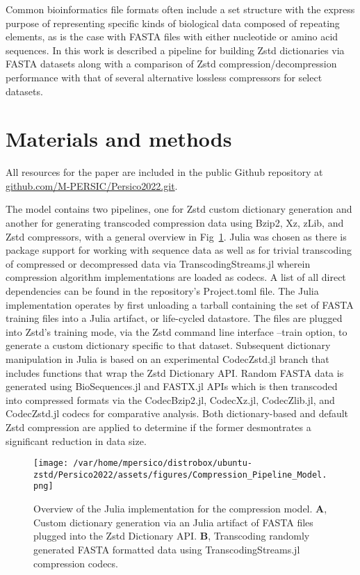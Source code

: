 \documentclass[
  10pt,
  letterpaper,
]{article}
\begin{document}
Common bioinformatics file formats often include a set structure with
the express purpose of representing specific kinds of biological data
composed of repeating elements, as is the case with FASTA files with
either nucleotide or amino acid sequences. In this work is described a
pipeline for building Zstd dictionaries via FASTA datasets along with a
comparison of Zstd compression/decompression performance with that of
several alternative lossless compressors for select datasets.

\hypertarget{materials-and-methods}{%
\section{Materials and methods}\label{materials-and-methods}}

All resources for the paper are included in the public Github repository
at
\href{https://www.github.com/M-PERSIC/Persico2022.git}{github.com/M-PERSIC/Persico2022.git}.

The model contains two pipelines, one for Zstd custom dictionary
generation and another for generating transcoded compression data using
Bzip2, Xz, zLib, and Zstd compressors, with a general overview in
Fig~\ref{fig-model}. Julia was chosen as there is package support for
working with sequence data as well as for trivial transcoding of
compressed or decompressed data via TranscodingStreams.jl wherein
compression algorithm implementations are loaded as codecs\citep{sato}.
A list of all direct dependencies can be found in the repository's
Project.toml file. The Julia implementation operates by first unloading
a tarball containing the set of FASTA training files into a Julia
artifact, or life-cycled datastore. The files are plugged into Zstd's
training mode, via the Zstd command line interface --train option, to
generate a custom dictionary specific to that dataset. Subsequent
dictionary manipulation in Julia is based on an experimental
CodecZstd.jl branch that includes functions that wrap the Zstd
Dictionary API\citep{kittisopikul}. Random FASTA data is generated using
BioSequences.jl\citep{biosequences} and FASTX.jl\citep{fastx} APIs which
is then transcoded into compressed formats via the
CodecBzip2.jl\citep{codecbzip2}, CodecXz.jl\citep{codecxz},
CodecZlib.jl\citep{codeczlib}, and CodecZstd.jl\citep{codeczstd} codecs
for comparative analysis. Both dictionary-based and default Zstd
compression are applied to determine if the former desmontrates a
significant reduction in data size.

\begin{figure}

{\centering \texttt{[image: /var/home/mpersico/distrobox/ubuntu-zstd/Persico2022/assets/figures/Compression\_Pipeline\_Model.png]}

}

\caption{\label{fig-model}Overview of the Julia implementation for the
compression model. \textbf{A}, Custom dictionary generation via an Julia
artifact of FASTA files plugged into the Zstd Dictionary API.
\textbf{B}, Transcoding randomly generated FASTA formatted data using
TranscodingStreams.jl\citep{sato} compression codecs.}

\end{figure}
\end{document}
